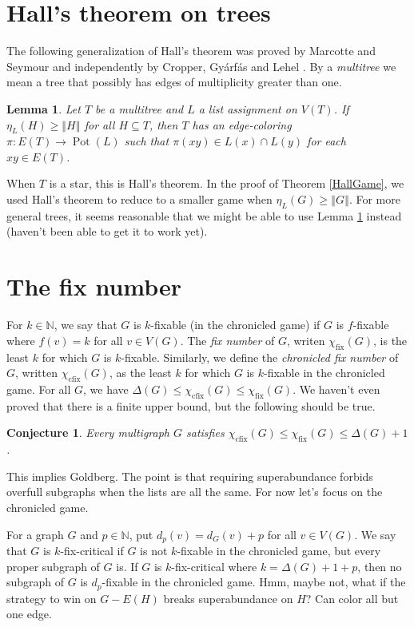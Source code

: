 \documentclass[12pt,reqno]{amsart}
\theoremstyle{plain}
\newtheorem{lem}[thm]{Lemma}
\newtheorem{conj}[thm]{Conjecture}
\theoremstyle{definition}
\theoremstyle{remark}
\newcommand{\IN}{\mathbb{N}}
\newcommand{\size}[1]{\left\Vert#1\right\Vert}
\newcommand{\func}[3]{#1\colon #2 \rightarrow #3}
\newcommand{\pot}{\operatorname{Pot}}
\newcommand{\fix}[1]{\chi_\text{fix}(#1)}
\newcommand{\cfix}[1]{\chi_\text{cfix}(#1)}
\begin{document}
\section{Hall's theorem on trees}
The following generalization of Hall's theorem was proved by Marcotte and Seymour \cite{marcotte1990extending} and independently by Cropper, Gy{\'a}rf{\'a}s and Lehel \cite{cropper2003edge}.  By a \emph{multitree} we mean a tree that possibly has edges of multiplicity greater than one.


\begin{lem}\label{MultiTreeHall}
Let $T$ be a multitree and $L$ a list assignment on $V(T)$.  If $\eta_L(H) \ge \size{H}$ for all $H \subseteq T$, then $T$ has an edge-coloring $\func{\pi}{E(T)}{\pot(L)}$ such that
$\pi(xy) \in L(x) \cap L(y)$ for each $xy \in E(T)$.
\end{lem}

When $T$ is a star, this is Hall's theorem.  In the proof of Theorem \ref{HallGame}, we used Hall's theorem to reduce to a smaller game when $\eta_L(G) \ge \size{G}$.  For more general trees, it seems reasonable that we might be able to use Lemma \ref{MultiTreeHall} instead (haven't been able to get it to work yet).


\section{The fix number}
For $k \in \IN$, we say that $G$ is $k$-fixable (in the chronicled game) if $G$ is $f$-fixable where $f(v) = k$ for all $v \in V(G)$.  The \emph{fix number} of $G$, writen $\fix{G}$, is the least $k$ for which $G$ is $k$-fixable.  Similarly, we define the \emph{chronicled fix number} of $G$, written $\cfix{G}$, as the least $k$ for which $G$ is $k$-fixable in the chronicled game.  For all $G$, we have $\Delta(G) \le \cfix{G} \le \fix{G}$.  We haven't even proved that there is a finite upper bound, but the following should be true.

\begin{conj}
Every multigraph $G$ satisfies $\cfix{G} \le \fix{G} \le \Delta(G) + 1$.
\end{conj}

This implies Goldberg.  The point is that requiring superabundance forbids overfull subgraphs when the lists are all the same. For now let's focus on the chronicled game.

For a graph $G$ and $p \in \IN$, put $d_p(v) = d_G(v) + p$ for all $v \in V(G)$.  We say that $G$ is $k$-fix-critical if $G$ is not $k$-fixable in the chronicled game, but every proper subgraph of $G$ is. 
If $G$ is $k$-fix-critical where $k = \Delta(G) + 1 + p$, then no subgraph of $G$ is $d_p$-fixable in the chronicled game.  Hmm, maybe not, what if the strategy to win on $G - E(H)$ breaks superabundance on $H$?  Can color all but one edge.





\end{document}
